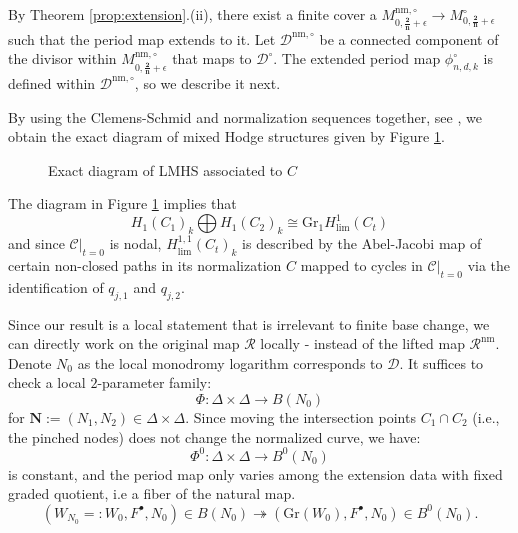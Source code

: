 \documentclass[12pt, letterpaper]{amsart}
\theoremstyle{plain}
\theoremstyle{definition}
\begin{document}
By Theorem \ref{prop:extension}.(ii), there exist a finite cover a
 $M^{\mathrm{nm},\circ}_{0,\mathbf{\frac{2}{n}} +
\epsilon} \longrightarrow
M^{\circ}_{0,\mathbf{\frac{2}{n}} +
\epsilon}
$ such that the period map extends to it. 
Let  $\mathcal{D}^{\mathrm{nm},\circ}$ be a connected component of the divisor within 
$M^{\mathrm{nm},\circ}_{0,\mathbf{\frac{2}{n}} + \epsilon}$ that maps to $\mathcal{D}^{\circ}$.
The extended period map $ \phi_{n,d,k}^{\circ}$ is 
defined within $\mathcal{D}^{\mathrm{nm},\circ}$, so we describe it next.

By using the Clemens-Schmid and normalization sequences together, see \cite[Sec 3.b]{Car80}, we obtain
the exact diagram of mixed Hodge structures 
given by Figure \ref{fig:ExactDiagram}.
\begin{figure}[h!]
\centering
{} 
\caption{Exact diagram of LMHS associated to $C$}
\label{fig:ExactDiagram}
\end{figure}

The diagram in Figure \ref{fig:ExactDiagram} implies that
\begin{equation}
H_1(C_1)_k\bigoplus H_1(C_2)_k\cong \mathrm{Gr}_1H^1_{\mathrm{lim}}(C_t)
\end{equation}
and since $\mathcal{C}|_{t=0}$ is nodal, $H^{1,1}_{\mathrm{lim}}(C_t)_k$ is described by the Abel-Jacobi map of certain non-closed paths in its normalization $C$ mapped to cycles in $\mathcal{C}|_{t=0}$ via the identification of $q_{j,1}$ and $q_{j,2}$.

Since our result is a local statement that is irrelevant to finite base change, we can directly work on the original map $\mathcal{R}$ locally - instead of the lifted map
$\mathcal{R}^{\mathrm{nm}}$. Denote $N_0$ as the local monodromy logarithm corresponds to $\mathcal{D}$. It suffices to check a local $2$-parameter family:
\begin{equation}
\Phi: \Delta\times \Delta\rightarrow B(N_0)    
\end{equation}
for $\mathbf{N}:=(N_1,N_2)\in \Delta\times \Delta$. Since moving the intersection points $C_1 \cap C_2$ (i.e., the pinched nodes) does not change the normalized curve, we have: 
\begin{equation}
\Phi^0: \Delta\times \Delta\rightarrow  B^0(N_0)
\end{equation}
is constant, and the period map only varies among the extension data with fixed graded quotient, i.e a fiber of the natural map. 
\begin{equation}
  (W_{N_0}=:W_0, F^{\bullet}, N_0)\in B(N_0)\twoheadrightarrow (\mathrm{Gr}(W_{0}), F^{\bullet}, N_0)\in B^0(N_0).
\end{equation}
\end{document}
